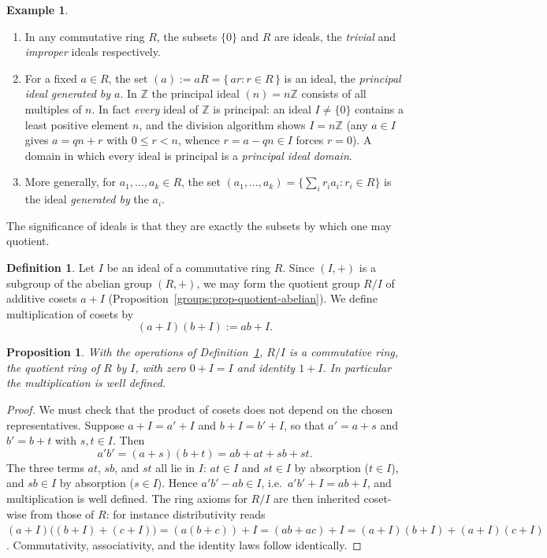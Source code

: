 \documentclass[11pt,a4paper]{article}
\newtheorem{proposition}[theorem]{Proposition}
\theoremstyle{definition}
\newtheorem{definition}[theorem]{Definition}
\newtheorem{example}[theorem]{Example}
\theoremstyle{remark}
\newcommand{\Z}{\ensuremath{\mathbb{Z}}}
\begin{document}
\begin{example}\label{ringsfields:exa-ideal}
\begin{enumerate}
\item In any commutative ring \(R\), the subsets \(\{0\}\) and \(R\) are ideals, the \emph{trivial} and \emph{improper} ideals respectively.
\item For a fixed \(a\in R\), the set \((a) := aR = \{\,ar : r\in R\,\}\) is an ideal, the \emph{principal ideal generated by \(a\)}. In \(\Z\) the principal ideal \((n) = n\Z\) consists of all multiples of \(n\). In fact \emph{every} ideal of \(\Z\) is principal: an ideal \(I\neq\{0\}\) contains a least positive element \(n\), and the division algorithm shows \(I = n\Z\) (any \(a\in I\) gives \(a = qn + r\) with \(0\le r<n\), whence \(r = a-qn\in I\) forces \(r=0\)). A domain in which every ideal is principal is a \emph{principal ideal domain}.
\item More generally, for \(a_1,\dots,a_k\in R\), the set \((a_1,\dots,a_k) = \{\sum_i r_i a_i : r_i\in R\}\) is the ideal \emph{generated by} the \(a_i\).
\end{enumerate}
\end{example}

The significance of ideals is that they are exactly the subsets by which one may quotient.

\begin{definition}\label{ringsfields:def-quotient}
Let \(I\) be an ideal of a commutative ring \(R\). Since \((I,+)\) is a subgroup of the abelian group \((R,+)\), we may form the quotient group \(R/I\) of additive cosets \(a + I\) (Proposition~\ref{groups:prop-quotient-abelian}). We define multiplication of cosets by
\[
(a+I)(b+I) := ab + I .
\]
\end{definition}

\begin{proposition}\label{ringsfields:prop-quotient-well-defined}
With the operations of Definition~\ref{ringsfields:def-quotient}, \(R/I\) is a commutative ring, the \emph{quotient ring} of \(R\) by \(I\), with zero \(0+I = I\) and identity \(1+I\). In particular the multiplication is well defined.
\end{proposition}

\begin{proof}
We must check that the product of cosets does not depend on the chosen representatives. Suppose \(a+I = a'+I\) and \(b+I = b'+I\), so that \(a' = a + s\) and \(b' = b + t\) with \(s,t\in I\). Then
\[
a'b' = (a+s)(b+t) = ab + at + sb + st .
\]
The three terms \(at\), \(sb\), and \(st\) all lie in \(I\): \(at\in I\) and \(st\in I\) by absorption (\(t\in I\)), and \(sb\in I\) by absorption (\(s\in I\)). Hence \(a'b' - ab \in I\), i.e.\ \(a'b' + I = ab + I\), and multiplication is well defined. The ring axioms for \(R/I\) are then inherited coset-wise from those of \(R\): for instance distributivity reads \((a+I)\bigl((b+I)+(c+I)\bigr) = (a(b+c))+I = (ab+ac)+I = (a+I)(b+I)+(a+I)(c+I)\). Commutativity, associativity, and the identity laws follow identically.
\end{proof}
\end{document}
